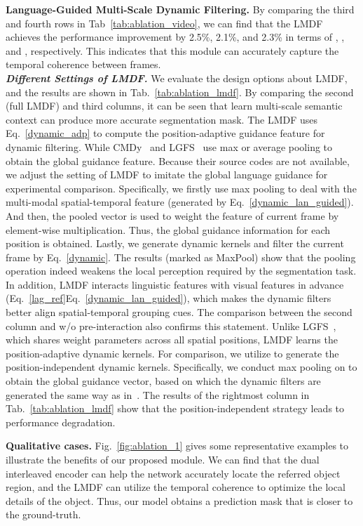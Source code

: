 \documentclass[10pt,twocolumn,letterpaper]{article}
\begin{document}
\noindent\textbf{Language-Guided Multi-Scale Dynamic Filtering.}
By comparing the third and fourth rows in Tab~\ref{tab:ablation_video}, we can find that the LMDF achieves the performance improvement by 2.5\%, 2.1\%, and 2.3\% in terms of , , and , respectively. This indicates that this module can accurately capture the temporal coherence between frames.\\
\emph{\textbf{Different Settings of LMDF.}}
We evaluate the design options about LMDF, and the results are shown in Tab.~\ref{tab:ablation_lmdf}.
By comparing the second (full LMDF) and third columns, it can be seen that learn multi-scale semantic context can produce more accurate segmentation mask.
The LMDF uses Eq.~\ref{dynamic_adp} to compute the position-adaptive guidance feature for dynamic filtering. While CMDy~\cite{wang2020context} and LGFS~\cite{hui2021collaborative} use max or average pooling to obtain the global guidance feature. Because their source codes are not available, we adjust the setting of LMDF to imitate the global language guidance for experimental comparison.
Specifically, we firstly use max pooling to deal with the multi-modal spatial-temporal feature  (generated by Eq.~\ref{dynamic_lan_guided}). And then, the pooled vector is used to weight the feature of current frame  by element-wise multiplication. Thus, the global guidance information for each position is obtained.  Lastly, we generate dynamic kernels and filter the current frame by Eq.~\ref{dynamic}. The results (marked as MaxPool) show that the pooling operation indeed weakens the local perception required by the segmentation task.
In addition, LMDF interacts linguistic features with visual features in advance (Eq.~\ref{lag_ref}Eq.~\ref{dynamic_lan_guided}), which makes the dynamic filters better align spatial-temporal grouping cues. The comparison between the second column and w/o pre-interaction also confirms this statement.
Unlike LGFS~\cite{hui2021collaborative}, which shares weight parameters across all spatial positions, LMDF learns the position-adaptive dynamic kernels. For comparison, we utilize  to generate the position-independent dynamic kernels.
Specifically, we conduct max pooling on  to obtain the global guidance vector, based on which the dynamic filters are generated the same way as in~\cite{hui2021collaborative}.
The results of the rightmost column in Tab.~\ref{tab:ablation_lmdf} show that the position-independent strategy leads to performance degradation.

\noindent\textbf{Qualitative cases.}
Fig.~\ref{fig:ablation_1} gives some representative examples to illustrate the benefits of our proposed module. We can find that the dual interleaved encoder can help the network accurately locate the referred object region, and the LMDF can utilize the temporal coherence to optimize the local details of the object. Thus, our model obtains a prediction mask that is closer to the ground-truth.
\end{document}
